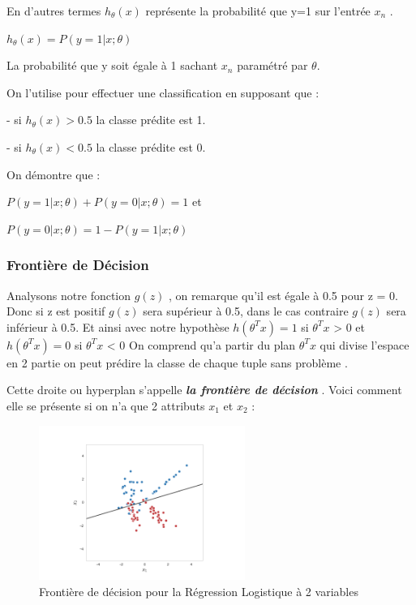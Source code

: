 En d'autres termes ${h}_{\theta}\left(x\right)$ représente la probabilité que y=1 sur l'entrée  ${x}_{n}$ .
\begin{center}
	${h}_{\theta}\left(x\right)=P(y=1|x;\theta)$
\end{center}
La probabilité que y soit égale à 1 sachant ${x}_{n}$ paramétré par $\theta$.

On l'utilise pour effectuer une classification en supposant que :

- si ${h}_{\theta}\left(x\right)> 0.5 $ la classe prédite est 1.

- si ${h}_{\theta}\left(x\right)< 0.5 $ la classe prédite est 0.

On démontre que :
\begin{center}
	$P(y=1|x;\theta) + P(y=0|x;\theta) = 1 $ et
	
	$P(y=0|x;\theta) = 1-  P(y=1|x;\theta)$
\end{center}
\subsubsection{Frontière de Décision }
Analysons notre fonction $g(z)$ , on remarque qu'il est égale à 0.5 pour z = 0.
Donc si z est positif $g(z)$ sera supérieur à 0.5, dans le cas contraire $g(z)$ sera inférieur à 0.5.
Et ainsi avec notre hypothèse
$h({\theta }^{T}{x}) = 1 $ si  ${\theta }^{T}{x}$ > 0 et 
$h({\theta }^{T}{x}) = 0 $ si  ${\theta }^{T}{x}$ < 0
On comprend qu'a partir du plan  ${\theta }^{T}{x}$ qui divise l'espace en 2 partie on peut prédire la classe de chaque tuple  sans problème .

Cette droite ou hyperplan  s'appelle \emph{\textbf{la frontière de décision }}.
Voici comment elle se présente si on n'a que 2 attributs ${x}_{1}$ et ${x}_{2}$ :
\begin{figure}[ht]
	\centering
	\includegraphics[width=0.6\textwidth]{fig/DecisionBoudary.png}
	\caption{Frontière de décision pour la Régression Logistique à 2 variables}
	\label{fig:image5}
\end{figure}

